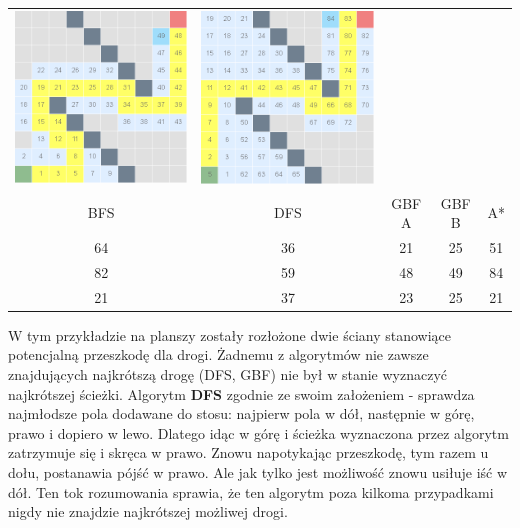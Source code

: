 \documentclass{article}
\begin{document}
\begin{center}
\begin{tabular}{c c c c c}
\includegraphics[scale=0.15]{images/scr8.png} &
\includegraphics[scale=0.15]{images/scr9.png} \\
BFS & DFS & GBF A & GBF B & A* \\
64 & 36 & 21 & 25 & 51 \\
82 & 59 & 48 & 49 & 84\\
21 & 37 & 23 & 25 & 21\\
\end{tabular}
\end{center}
W tym przykładzie na planszy zostały rozłożone dwie ściany stanowiące potencjalną przeszkodę dla drogi. Żadnemu z algorytmów nie zawsze znajdujących najkrótszą drogę (DFS, GBF) nie był w stanie wyznaczyć najkrótszej ścieżki. Algorytm \textbf{DFS} zgodnie ze swoim założeniem - sprawdza najmłodsze pola dodawane do stosu: najpierw pola w dół, następnie w górę, prawo i dopiero w lewo. Dlatego idąc w górę i ścieżka wyznaczona przez algorytm zatrzymuje się i skręca w prawo. Znowu napotykając przeszkodę, tym razem u dołu, postanawia pójść w prawo. Ale jak tylko jest możliwość znowu usiłuje iść w dół. Ten tok rozumowania sprawia, że ten algorytm poza kilkoma przypadkami nigdy nie znajdzie najkrótszej możliwej drogi. \\
\end{document}
